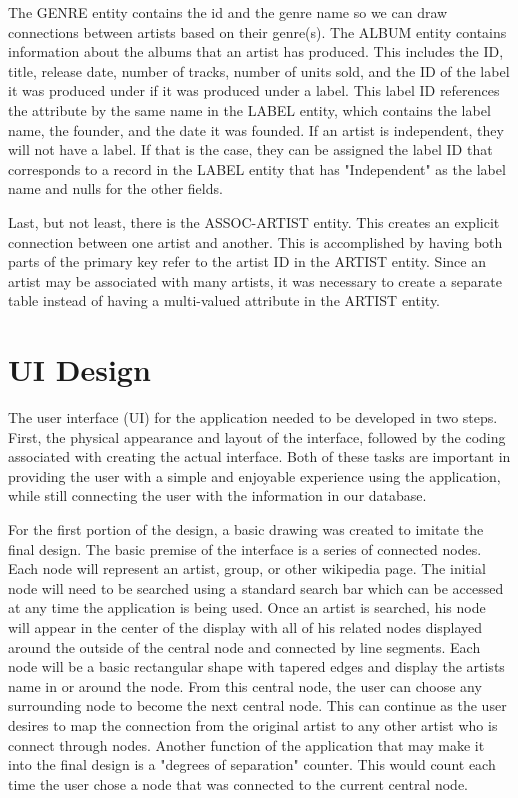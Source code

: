 \documentclass{sig-alternate}
\begin{document}
The GENRE entity contains the id and the genre name so we can draw connections between artists based on their 
genre(s). The ALBUM entity contains information about the albums that an artist has produced. This includes the 
ID, title, release date, number of tracks, number of units sold, and the ID of the label it was produced under 
if it was produced under a label. This label ID references the attribute by the same name in the LABEL entity, 
which contains the label name, the founder, and the date it was founded. If an artist is independent, they will 
not have a label. If that is the case, they can be assigned the label ID that corresponds to a record in the 
LABEL entity that has "Independent" as the label name and nulls for the other fields.

Last, but not least, there is the ASSOC-ARTIST entity. This creates an explicit connection between one artist 
and another. This is accomplished by having both parts of the primary key refer to the artist ID in the ARTIST 
entity. Since an artist may be associated with many artists, it was necessary to create a separate table instead 
of having a multi-valued attribute in the ARTIST entity.

\section{UI Design}
\label{ui design}

The user interface (UI) for the application needed to be developed in two steps. First, the physical appearance 
and layout of the interface, followed by the coding associated with creating the actual interface. Both of these 
tasks are important in providing the user with a simple and enjoyable experience using the application, while 
still connecting the user with the information in our database. 

For the first portion of the design, a basic drawing was created to imitate the final design. The basic premise 
of the interface is a series of connected nodes. Each node will represent an artist, group, or other wikipedia 
page. The initial node will need to be searched using a standard search bar which can be accessed at any time 
the application is being used. Once an artist is searched, his node will appear in the center of the display 
with all of his related nodes displayed around the outside of the central node and connected by line segments. 
Each node will be a basic rectangular shape with tapered edges and display the artists name in or around the node. 
From this central node, the user can choose any surrounding node to become the next central node. This can continue 
as the user desires to map the connection from the original artist to any other artist who is connect through nodes.
Another function of the application that may make it into the final design is a "degrees of separation" counter. 
This would count each time the user chose a node that was connected to the current central node. 
\end{document}
